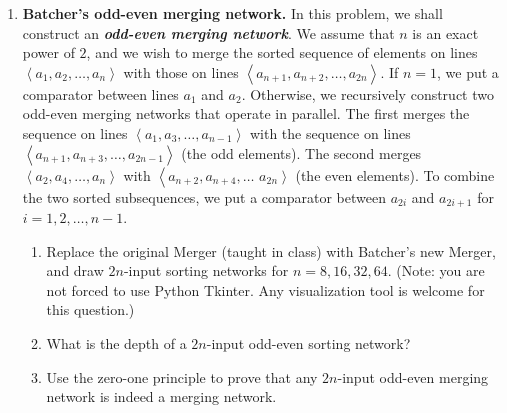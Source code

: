 \documentclass[12pt,a4paper]{article}
\theoremstyle{definition}
\begin{document}
\begin{enumerate}
\begin{proof}
		
	

		
       
	\end{proof}






    \item
    \textbf{Batcher's odd-even merging network.} In this problem, we shall construct an \textbf{\textit{odd-even merging network}}. We assume that $n$ is an exact power of $2$, and we wish to merge the sorted sequence of elements on lines $\left\langle a_{1}, a_{2}, \ldots, a_{n}\right\rangle$ with those on lines $\left\langle a_{n+1}, a_{n+2}, \ldots, a_{2n}\right\rangle .$ If $n=1$, we put a comparator between lines $a_{1}$ and $a_{2}$. Otherwise, we recursively construct two odd-even merging networks that operate in parallel. The first merges the sequence on lines $\left\langle a_{1}, a_{3}, \ldots, a_{n-1}\right\rangle$ with the sequence on lines $\left\langle a_{n+1}, a_{n+3}, \ldots, a_{2n-1}\right\rangle$ (the
    odd elements). The second merges $\left\langle a_{2}, a_{4}, \ldots, a_{n}\right\rangle$ with $\left\langle a_{n+2}, a_{n+4}, \ldots\right.$
    $\left.a_{2n}\right\rangle$ (the even elements). To combine the two sorted subsequences, we put a comparator between $a_{2i}$ and $a_{2i+1}$ for $i=1,2, \ldots, n-1$.
    \begin{enumerate}
    	\item Replace the original Merger (taught in class) with Batcher's new Merger, and draw $2n$-input sorting networks for $n=8, 16, 32, 64$. {\color{blue}(Note: you are not forced to use Python Tkinter. Any visualization tool is welcome for this question.)}
    	
    	\item What is the depth of a $2n$-input odd-even sorting network?
    	
    	\item
    	{\color{red}{(Optional Sub-question with Bonus)}} Use the zero-one principle to prove that any $2n$-input odd-even merging network is indeed a merging network.
    	
	\end{enumerate}
	

\end{enumerate}
\end{document}
